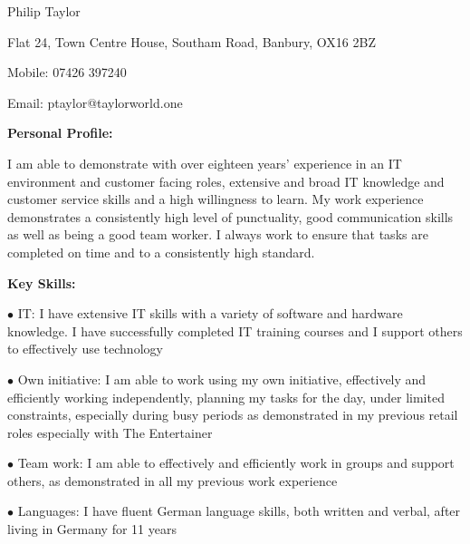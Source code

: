 \documentclass[12pt,a4paper]{book}
\begin{document}
\begin{center}
Philip Taylor

Flat 24, Town Centre House, Southam Road, Banbury, OX16 2BZ

Mobile: 07426 397240

Email: ptaylor@taylorworld.one
\end{center}
\begin{center}
\textbf {Personal Profile:}

I am able to demonstrate with over eighteen years' experience in an IT
environment and customer facing roles, extensive and broad IT knowledge
and customer service skills and a high willingness to learn. My work
experience demonstrates a consistently high level of punctuality, good
communication skills as well as being a good team worker. I always work
to ensure that tasks are completed on time and to a consistently high
standard.
\end{center}
\begin{flushleft}
\textbf {Key Skills:}
  \item[$\bullet$ IT:] I have extensive IT skills with a variety of software and
  hardware knowledge. I have successfully completed IT training courses
  and I support others to effectively use technology

  \item[$\bullet$ Own initiative:] I am able to work using my own initiative,
  effectively and efficiently working independently, planning my tasks
  for the day, under limited constraints, especially during busy periods
  as demonstrated in my previous retail roles especially with The
  Entertainer
  
\item[$\bullet$ Team work:] I am able to effectively and efficiently work in
  groups and support others, as demonstrated in all my previous work
  experience
  
\item[$\bullet$ Languages:] I have fluent German language skills, both written
  and verbal, after living in Germany for 11 years
\end{flushleft}
\end{document}
